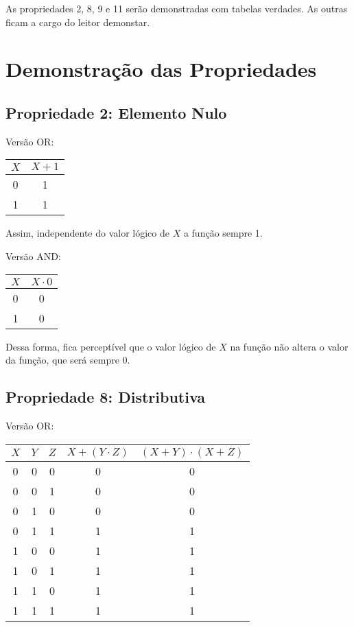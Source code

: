 \documentclass[12pt]{article}
\begin{document}
As propriedades 2, 8, 9 e 11 serão demonstradas com tabelas verdades. As outras ficam a cargo do leitor demonstar.

\section{Demonstração das Propriedades}

\subsection{Propriedade 2: Elemento Nulo}

Versão OR:
\begin{center}
\begin{tabular}{|c|c|}
\hline
$X$  & $X + 1$ \\
\hline
0 & 1 \\
1 & 1 \\
\hline
\end{tabular}
\end{center}

Assim, independente do valor lógico de $X$ a função sempre 1.

Versão AND: 
\begin{center}
\begin{tabular}{|c|c|}
\hline
$X$  & $X \cdot 0$ \\
\hline
0 & 0 \\
1 & 0 \\
\hline
\end{tabular}
\end{center}

Dessa forma, fica perceptível que o valor lógico de $X$ na função não altera o valor da função, que será sempre 0.

\subsection{Propriedade 8: Distributiva}

Versão OR:
\begin{center}
\begin{tabular}{|c|c|c|c|c|}
\hline
$X$  & $Y$ & $Z$ & $X + (Y \cdot Z)$ & $(X + Y) \cdot (X + Z)$ \\
\hline
0 & 0 & 0 & 0 & 0 \\
0 & 0 & 1 & 0 & 0 \\
0 & 1 & 0 & 0 & 0 \\
0 & 1 & 1 & 1 & 1 \\
1 & 0 & 0 & 1 & 1 \\
1 & 0 & 1 & 1 & 1 \\
1 & 1 & 0 & 1 & 1 \\
1 & 1 & 1 & 1 & 1 \\
\hline 
\end{tabular}
\end{center}
\end{document}
